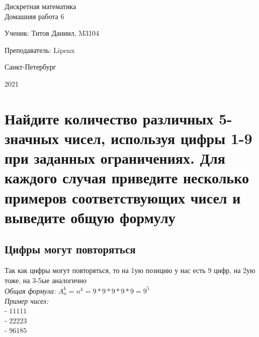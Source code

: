 \documentclass{article}
\begin{document}
    \begin{center}
        \hfill \break
        \LARGE{Дискретная математика}\\
        \hfill \break
        \Large{Домашняя работа 6}\\
        \hfill \break
        \hfill \break
        \hfill \break
        \hfill \break
    \end{center}

    \begin{flushright} Ученик: Титов Даниил, M3104 \end{flushright}
    \begin{flushright} Преподаватель: Lipenx \end{flushright}
    \vfill
    \bigskip
    \begin{center} Санкт-Петербург \end{center}
    \begin{center} 2021 \end{center}
    \thispagestyle{empty}
    \newpage
    \tableofcontents{}
    \newpage
    \section{Найдите количество различных 5-значных чисел, используя цифры 1-9 при заданных ограничениях. Для каждого случая приведите несколько примеров соответствующих чисел и выведите общую формулу}
        \subsection{Цифры могут повторяться}
            Так как цифры могут повторяться, то на 1ую позицию у нас есть 9 цифр, на 2ую тоже, на 3-5ые аналогично\\
            \textit{Общая формула:} $ \overline{A^k_n} = n^k = 9*9*9*9*9 = 9^5 $\\
            \textit{Пример чисел:}\\
            - $11111$\\
            - $22223$\\
            - $96185$
\end{document}
